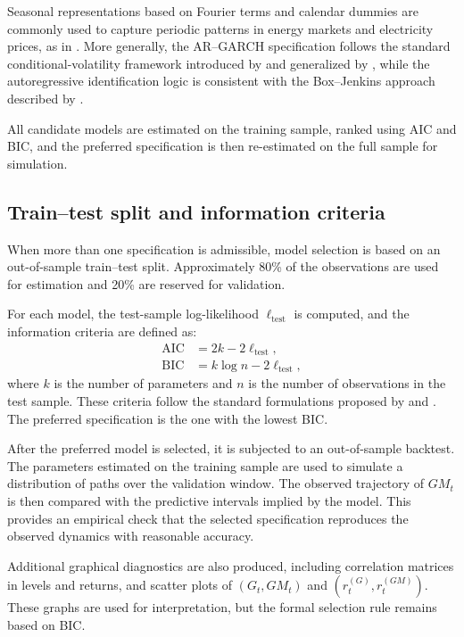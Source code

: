 \documentclass[authoryear,preprint,review,10pt]{elsarticle}
\begin{document}
Seasonal representations based on Fourier terms and calendar dummies are commonly used to capture periodic patterns in energy markets and electricity prices, as in \citet{lucia2002electricity}. More generally, the AR--GARCH specification follows the standard conditional-volatility framework introduced by \citet{engle1982autoregressive} and generalized by \citet{bollerslev1986generalized}, while the autoregressive identification logic is consistent with the Box--Jenkins approach described by \citet{box2015time}.

All candidate models are estimated on the training sample, ranked using AIC and BIC, and the preferred specification is then re-estimated on the full sample for simulation.

\subsection{Train--test split and information criteria}
\label{appendix:model_selection_dep}

When more than one specification is admissible, model selection is based on an out-of-sample train--test split. Approximately 80\% of the observations are used for estimation and 20\% are reserved for validation.

For each model, the test-sample log-likelihood $\ell_{\text{test}}$ is computed, and the information criteria are defined as:
\begin{align}
    \mathrm{AIC} &= 2k - 2\ell_{\text{test}},\\
    \mathrm{BIC} &= k \log n - 2\ell_{\text{test}},
\end{align}
where $k$ is the number of parameters and $n$ is the number of observations in the test sample. These criteria follow the standard formulations proposed by \citet{akaike2003new} and \citet{schwarz1978estimating}. The preferred specification is the one with the lowest BIC.

After the preferred model is selected, it is subjected to an out-of-sample backtest. The parameters estimated on the training sample are used to simulate a distribution of paths over the validation window. The observed trajectory of $GM_t$ is then compared with the predictive intervals implied by the model. This provides an empirical check that the selected specification reproduces the observed dynamics with reasonable accuracy.

Additional graphical diagnostics are also produced, including correlation matrices in levels and returns, and scatter plots of $(G_t,GM_t)$ and $(r_t^{(G)},r_t^{(GM)})$. These graphs are used for interpretation, but the formal selection rule remains based on BIC.
\end{document}
